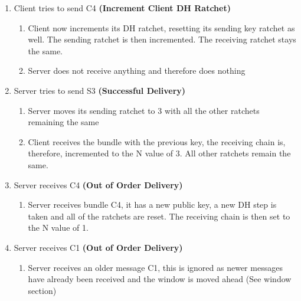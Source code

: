 \begin{enumerate}
    \item Client tries to send C4 \textbf{(Increment Client DH Ratchet)}
    \begin{enumerate}
        \item Client now increments its DH ratchet, resetting its sending key ratchet as well. The sending ratchet is then incremented. The receiving ratchet stays the same.
        \item Server does not receive anything and therefore does nothing
    \end{enumerate}

    \item Server tries to send S3 \textbf{(Successful Delivery)}
    \begin{enumerate}
        \item Server moves its sending ratchet to 3 with all the other ratchets remaining the same
        \item Client receives the bundle with the previous key, the receiving chain is, therefore, incremented to the N value of 3. All other ratchets remain the same.
    \end{enumerate}

    \item Server receives C4 \textbf{(Out of Order Delivery)}
    \begin{enumerate}
        \item Server receives bundle C4, it has a new public key, a new DH step is taken and all of the ratchets are reset. The receiving chain is then set to the N value of 1.
    \end{enumerate}

    \item Server receives C1 \textbf{(Out of Order Delivery)}
    \begin{enumerate}
        \item Server receives an older message C1, this is ignored as newer messages have already been received and the window is moved ahead (See window section)
    \end{enumerate}
\end{enumerate}

